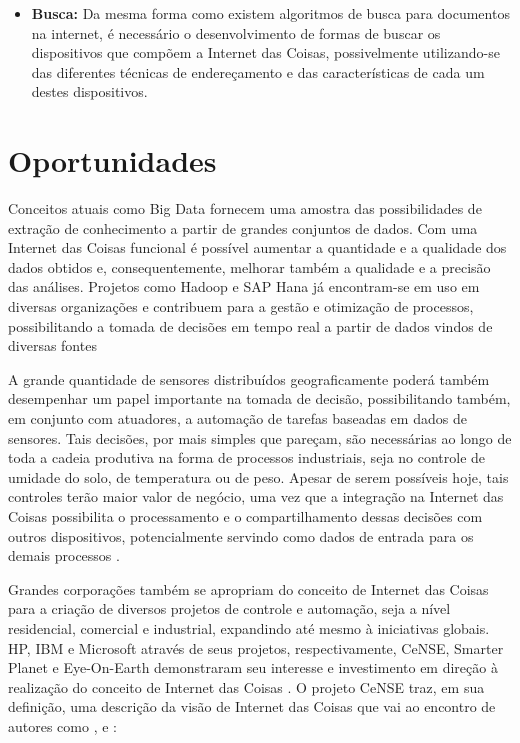 \documentclass[twoside,english,brazilian]{UNISINOSmonografia}
\begin{document}
\begin{itemize}
	\item \textbf{Busca:}
Da mesma forma como existem algoritmos de busca para documentos na internet, 
é necessário o desenvolvimento de formas de buscar os dispositivos que compõem 
a Internet das Coisas, possivelmente utilizando-se das diferentes técnicas de 
endereçamento e das características de cada um destes dispositivos.
	
\end{itemize}




\section{Oportunidades}


Conceitos atuais como Big Data fornecem uma amostra das possibilidades de 
extração de conhecimento a partir de grandes conjuntos de dados. 
Com uma Internet das Coisas funcional é possível aumentar a quantidade e a 
qualidade dos dados obtidos e, consequentemente, melhorar também a 
qualidade e a precisão das análises.
Projetos como Hadoop e SAP Hana já encontram-se em uso em diversas 
organizações e contribuem para a gestão e otimização de processos, 
possibilitando a tomada de decisões em tempo real a partir de dados 
vindos de diversas fontes


A grande quantidade de sensores distribuídos geograficamente poderá também 
desempenhar um papel importante na tomada de decisão, possibilitando também, 
em conjunto com atuadores, a automação de tarefas baseadas em dados de 
sensores.
Tais decisões, por mais simples que pareçam, são necessárias ao longo de toda 
a cadeia produtiva na forma de processos industriais, seja no controle de 
umidade do solo, de temperatura ou de peso.
Apesar de serem possíveis hoje, tais controles terão maior valor de negócio, 
uma vez que a integração na Internet das Coisas possibilita o processamento e 
o compartilhamento dessas decisões com outros dispositivos, potencialmente 
servindo como dados de entrada para os demais processos \cite{ITU2005}.


Grandes corporações também se apropriam do conceito de Internet das Coisas 
para a criação de diversos projetos de controle e automação, seja a nível 
residencial, comercial e industrial, expandindo até mesmo à iniciativas 
globais.
HP, IBM e Microsoft através de seus projetos, respectivamente, CeNSE, Smarter 
Planet e Eye-On-Earth demonstraram seu interesse e investimento em direção à 
realização do conceito de Internet das Coisas \cite{Coetzee2011}.
O projeto CeNSE traz, em sua definição, uma descrição da visão de Internet das 
Coisas que vai ao encontro de autores como , 
 e :
\end{document}
